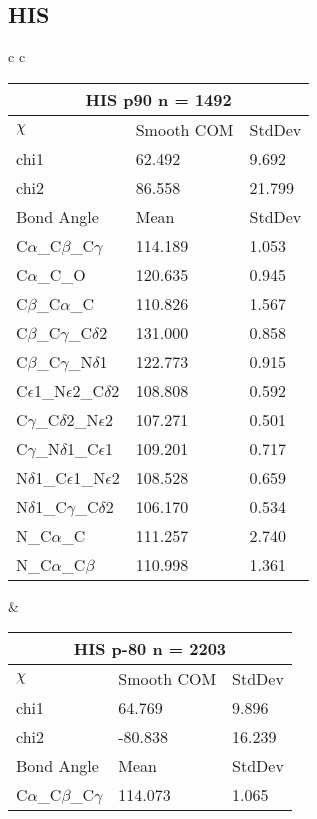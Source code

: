 \newpage
\subsection{HIS}

\begin{longtable}{ c c }

  \begin{tabular}{ l l l }
  \toprule
  \multicolumn{3}{c}{HIS \textbf{p90} n = 1492} \\ \toprule
  $\chi$       & Smooth COM & StdDev \\ \midrule
  chi1 & 62.492 & 9.692 \\ 
  chi2 & 86.558 & 21.799 \\ \midrule
  Bond Angle   & Mean     & StdDev \\ \midrule
  C$\alpha$\_C$\beta$\_C$\gamma$ & 114.189 & 1.053\\
  C$\alpha$\_C\_O & 120.635 & 0.945\\
  C$\beta$\_C$\alpha$\_C & 110.826 & 1.567\\
  C$\beta$\_C$\gamma$\_C$\delta$2 & 131.000 & 0.858\\
  C$\beta$\_C$\gamma$\_N$\delta$1 & 122.773 & 0.915\\
  C$\epsilon$1\_N$\epsilon$2\_C$\delta$2 & 108.808 & 0.592\\
  C$\gamma$\_C$\delta$2\_N$\epsilon$2 & 107.271 & 0.501\\
  C$\gamma$\_N$\delta$1\_C$\epsilon$1 & 109.201 & 0.717\\
  N$\delta$1\_C$\epsilon$1\_N$\epsilon$2 & 108.528 & 0.659\\
  N$\delta$1\_C$\gamma$\_C$\delta$2 & 106.170 & 0.534\\
  N\_C$\alpha$\_C & 111.257 & 2.740\\
  N\_C$\alpha$\_C$\beta$ & 110.998 & 1.361\\
  \bottomrule
  \end{tabular}
  &
  \begin{tabular}{ l l l }
  \toprule
  \multicolumn{3}{c}{HIS \textbf{p-80} n = 2203} \\ \toprule
  $\chi$       & Smooth COM & StdDev \\ \midrule
  chi1 & 64.769 & 9.896 \\ 
  chi2 & -80.838 & 16.239 \\ \midrule
  Bond Angle   & Mean     & StdDev \\ \midrule
  C$\alpha$\_C$\beta$\_C$\gamma$ & 114.073 & 1.065\\

\end{tabular}
\end{longtable}
